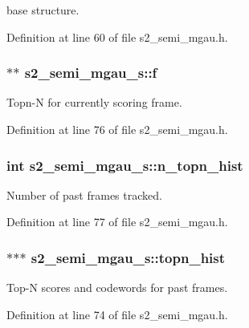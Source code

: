 base structure. 



Definition at line 60 of file s2\-\_\-semi\-\_\-mgau.\-h.

\subsubsection[{f}]{$\ast$$\ast$ s2\-\_\-semi\-\_\-mgau\-\_\-s\-::f}\label{structs2__semi__mgau__s_ad8cb7f058bcc7402dd6a41c61f1b26e5}


Topn-\/\-N for currently scoring frame. 



Definition at line 76 of file s2\-\_\-semi\-\_\-mgau.\-h.

\subsubsection[{n\-\_\-topn\-\_\-hist}]{\setlength{\rightskip}{0pt plus 5cm}int s2\-\_\-semi\-\_\-mgau\-\_\-s\-::n\-\_\-topn\-\_\-hist}\label{structs2__semi__mgau__s_a3cbc9fe683da5b7befe6b2712adae327}


Number of past frames tracked. 



Definition at line 77 of file s2\-\_\-semi\-\_\-mgau.\-h.

\subsubsection[{topn\-\_\-hist}]{$\ast$$\ast$$\ast$ s2\-\_\-semi\-\_\-mgau\-\_\-s\-::topn\-\_\-hist}\label{structs2__semi__mgau__s_a8892e22acbf81b08972cb6d7968ed4ce}


Top-\/\-N scores and codewords for past frames. 



Definition at line 74 of file s2\-\_\-semi\-\_\-mgau.\-h.

